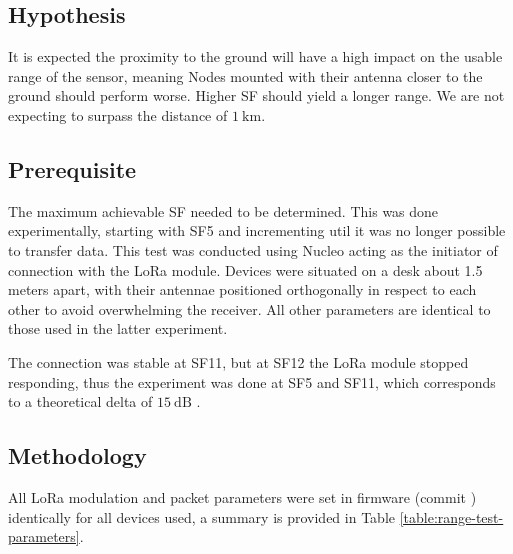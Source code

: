 \subsection{Hypothesis}
It is expected the proximity to the ground will have a high impact on the usable range of the sensor, meaning Nodes mounted with their antenna closer to the ground should perform worse. Higher SF should yield a longer range. We are not expecting to surpass the distance of $1~\mathrm{km}$.

\subsection{\label{section:range-prerequisite}Prerequisite}
The maximum achievable SF needed to be determined. This was done experimentally, starting with SF5 and incrementing util it was no longer possible to transfer data. This test was conducted using Nucleo acting as the initiator of connection with the LoRa module. Devices were situated on a desk about 1.5 meters apart, with their antennae positioned orthogonally in respect to each other to avoid overwhelming the receiver. All other parameters are identical to those used in the latter experiment.

The connection was stable at SF11, but at SF12 the LoRa module stopped responding, thus the experiment was done at SF5 and SF11, which corresponds to a theoretical delta of $15~\mathrm{dB}$ \cite{semtech_corporation_sx12612_2024}.

\subsection{Methodology}
All LoRa modulation and packet parameters were set in firmware (commit ) identically for all devices used, a summary is provided in Table \ref{table:range-test-parameters}. 

